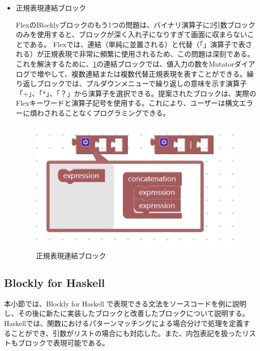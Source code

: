 \documentclass{risepaper}
\begin{document}
\begin{itemize}
\item 正規表現連結ブロック

FlexのBlocklyブロックのもう1つの問題は、バイナリ演算子に2引数ブロックのみを使用すると、ブロックが深く入れ子になりすぎて画面に収まらないことである。 Flexでは、連結（単純に並置される）と代替（「\textbar」演算子で表される）が正規表現で非常に頻繁に使用されるため、この問題は深刻である。これを解決するために、\ref{fig:flex_connection_block}の連結ブロックでは、値入力の数をMutatorダイアログで増やして、複数連結または複数代替正規表現を表すことができる。繰り返しブロックでは、プルダウンメニューで繰り返しの意味を示す演算子「+」、「*」、「？」から演算子を選択できる。提案されたブロックは、実際のFlexキーワードと演算子記号を使用する。これにより、ユーザーは構文エラーに煩わされることなくプログラミングできる。

\begin{figure}[h]
\begin{center}
\includegraphics[scale=0.8]{img/flex_connection_block.png}
\caption{正規表現連結ブロック}%
\label{fig:flex_connection_block}
\end{center}%
\end{figure}%

\end{itemize} 

   \subsection{Blockly for Haskell}

本小節では、Blockly for Haskell で表現できる文法をソースコードを例に説明し、その後に新たに実装したブロックと改善したブロックについて説明する。Haskellでは、関数におけるパターンマッチングによる場合分けで処理を定義することができ、引数がリストの場合にも対応した。また、内包表記を扱ったリストもブロックで表現可能である。
\end{document}

